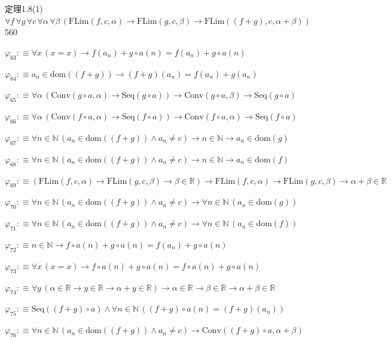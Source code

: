 \begin{fullproof}{定理1.8(1)}{$\forall f\,\forall g\,\forall c\,\forall \alpha\,\forall \beta\,(\mathrm{FLim}(f,c,\alpha) \to \mathrm{FLim}(g,c,\beta) \to \mathrm{FLim}((f + g),c,\alpha + \beta))$}{560}
\begin{abbrevlist}
\item $\varphi_{63} :\equiv \forall x\,(x = x) \to f(a_{n}) + g \circ a(n) = f(a_{n}) + g \circ a(n)$
\item $\varphi_{64} :\equiv a_{n} \in \mathrm{dom}((f + g)) \to (f + g)(a_{n}) = f(a_{n}) + g(a_{n})$
\item $\varphi_{65} :\equiv \forall \alpha\,(\mathrm{Conv}(g \circ a,\alpha) \to \mathrm{Seq}(g \circ a)) \to \mathrm{Conv}(g \circ a,\beta) \to \mathrm{Seq}(g \circ a)$
\item $\varphi_{66} :\equiv \forall \alpha\,(\mathrm{Conv}(f \circ a,\alpha) \to \mathrm{Seq}(f \circ a)) \to \mathrm{Conv}(f \circ a,\alpha) \to \mathrm{Seq}(f \circ a)$
\item $\varphi_{67} :\equiv \forall n \in \mathbb{N}\,(a_{n} \in \mathrm{dom}((f + g)) \land a_{n} \neq c) \to n \in \mathbb{N} \to a_{n} \in \mathrm{dom}(g)$
\item $\varphi_{68} :\equiv \forall n \in \mathbb{N}\,(a_{n} \in \mathrm{dom}((f + g)) \land a_{n} \neq c) \to n \in \mathbb{N} \to a_{n} \in \mathrm{dom}(f)$
\item $\varphi_{69} :\equiv (\mathrm{FLim}(f,c,\alpha) \to \mathrm{FLim}(g,c,\beta) \to \beta \in \mathbb{R}) \to \mathrm{FLim}(f,c,\alpha) \to \mathrm{FLim}(g,c,\beta) \to \alpha + \beta \in \mathbb{R}$
\item $\varphi_{70} :\equiv \forall n \in \mathbb{N}\,(a_{n} \in \mathrm{dom}((f + g)) \land a_{n} \neq c) \to \forall n \in \mathbb{N}\,(a_{n} \in \mathrm{dom}(g))$
\item $\varphi_{71} :\equiv \forall n \in \mathbb{N}\,(a_{n} \in \mathrm{dom}((f + g)) \land a_{n} \neq c) \to \forall n \in \mathbb{N}\,(a_{n} \in \mathrm{dom}(f))$
\item $\varphi_{72} :\equiv n \in \mathbb{N} \to f \circ a(n) + g \circ a(n) = f(a_{n}) + g \circ a(n)$
\item $\varphi_{73} :\equiv \forall x\,(x = x) \to f \circ a(n) + g \circ a(n) = f \circ a(n) + g \circ a(n)$
\item $\varphi_{74} :\equiv \forall y\,(\alpha \in \mathbb{R} \to y \in \mathbb{R} \to \alpha + y \in \mathbb{R}) \to \alpha \in \mathbb{R} \to \beta \in \mathbb{R} \to \alpha + \beta \in \mathbb{R}$
\item $\varphi_{75} :\equiv \mathrm{Seq}((f + g) \circ a) \land \forall n \in \mathbb{N}\,((f + g) \circ a(n) = (f + g)(a_{n}))$
\item $\varphi_{76} :\equiv \forall n \in \mathbb{N}\,(a_{n} \in \mathrm{dom}((f + g)) \land a_{n} \neq c) \to \mathrm{Conv}((f + g) \circ a,\alpha + \beta)$

\end{abbrevlist}
\end{fullproof}
